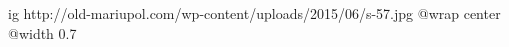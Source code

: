  
 
 
 
 

\ifcmt
  ig http://old-mariupol.com/wp-content/uploads/2015/06/s-57.jpg
  @wrap center
  @width 0.7
\fi
